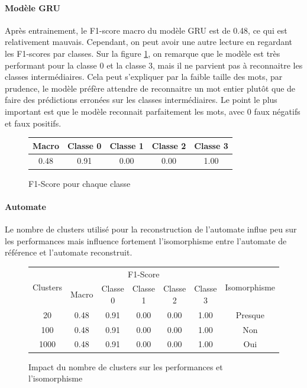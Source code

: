 \documentclass{article}
\begin{document}
\paragraph{Modèle GRU} Après entrainement, le F1-score macro du modèle GRU est de 0.48, ce qui est relativement mauvais. 
Cependant, on peut avoir une autre lecture en regardant les F1-scores par classes.
Sur la figure \ref{tab:f1-safe}, on remarque que le modèle est très performant pour la classe 0 et la classe 3, mais il ne 
parvient pas à reconnaitre les classes intermédiaires. Cela peut s'expliquer par la faible taille des mots, par prudence, le modèle 
préfère attendre de reconnaitre un mot entier plutôt que de faire des prédictions erronées sur les classes intermédiaires. 
Le point le plus important est que le modèle reconnait parfaitement les mots, avec 0 faux négatifs et faux positifs.

\begin{figure}[ht]
    \centering
    \begin{tabular}{|c|c|c|c|c|}
        \hline
        Macro & Classe 0 & Classe 1 & Classe 2 & Classe 3 \\
        \hline
        0.48 & 0.91 & 0.00 & 0.00 & 1.00 \\
        \hline
    \end{tabular}
    \caption{F1-Score pour chaque classe}
    \label{tab:f1-safe}
\end{figure}

\paragraph{Automate} Le nombre de clusters utilisé pour la reconstruction de l'automate influe peu sur les performances mais
influence fortement l'isomorphisme entre l'automate de référence et l'automate reconstruit.

\begin{figure}[ht]
    \centering
    \begin{tabular}{|c|c|c|c|c|c|c|}
        \hline
        \multirow{2}{*}{Clusters} & \multicolumn{5}{|c|}{F1-Score} & \multirow{2}{*}{Isomorphisme} \\
        \cline{2-6}
         & Macro & Classe 0 & Classe 1 & Classe 2 & Classe 3 & \\
        \hline
        20 & 0.48 & 0.91 & 0.00 & 0.00 & 1.00 & Presque \\
        \hline
        100 & 0.48 & 0.91 & 0.00 & 0.00 & 1.00 & Non \\
        \hline
        1000 & 0.48 & 0.91 & 0.00 & 0.00 & 1.00 & Oui \\
        \hline
    \end{tabular}
    \caption{Impact du nombre de clusters sur les performances et l'isomorphisme}
    \label{tab:clusters-safe}
\end{figure}
\end{document}
